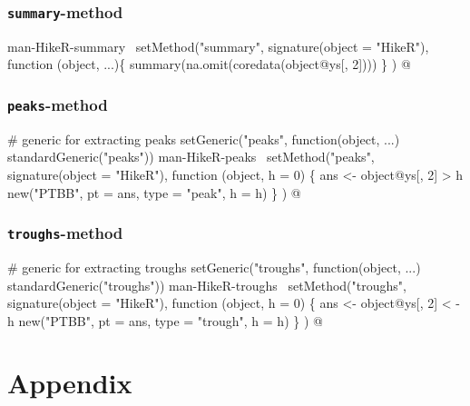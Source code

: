 \documentclass[a4paper]{article}
\begin{document}
\subsubsection{\texttt{summary}-method}

\nwenddocs{}\endmoddef
\LA{}man-HikeR-summary~{\nwtagstyle{}}\RA{}
setMethod("summary",
          signature(object = "HikeR"),
          function (object, ...)\{
              summary(na.omit(coredata(object@ys[, 2])))
          \}
)
\nwendcode{}@

\subsubsection{\texttt{peaks}-method}

\nwenddocs{}\endmoddef
# generic for extracting peaks
setGeneric("peaks", function(object, ...) standardGeneric("peaks"))
\LA{}man-HikeR-peaks~{\nwtagstyle{}}\RA{}
setMethod("peaks",
    signature(object = "HikeR"),
    function (object, h = 0) \{
        ans <- object@ys[, 2] > h
        new("PTBB", pt = ans, type = "peak", h = h)
    \}
)
\nwendcode{}@

\subsubsection{\texttt{troughs}-method}

\nwenddocs{}\endmoddef\let\nwnotused=\nwoutput{}
# generic for extracting troughs
setGeneric("troughs", function(object, ...) standardGeneric("troughs"))
\LA{}man-HikeR-troughs~{\nwtagstyle{}}\RA{}
setMethod("troughs",
    signature(object = "HikeR"),
    function (object, h = 0) \{
        ans <- object@ys[, 2] < -h
        new("PTBB", pt = ans, type = "trough", h = h)
    \}
)
\nwnotused{HikeR-troughs}\nwendcode{}@


\section{Appendix}
\end{document}
